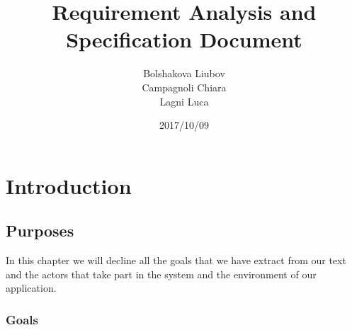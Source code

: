 \documentclass[a4paper,leqno]{book}
\begin{document}
\date{2017/10/09}
\author{Bolshakova Liubov\\ Campagnoli Chiara\\ Lagni Luca}
\title{Requirement Analysis and Specification Document}
\frontmatter                            %
\maketitle                              %
\tableofcontents                        %
\mainmatter   

\chapter{Introduction}

\section{Purposes}
In this chapter we will decline all the goals that we have extract from our text and the actors that take part in the system and the environment of our application.

\subsection{Goals}
\end{document}

